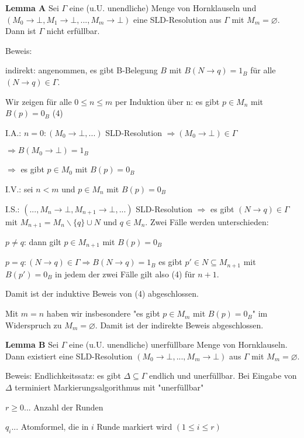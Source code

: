 \documentclass[a4paper]{article}
\renewcommand{\note}[2]{\begin{noteBox} \textbf{#1} #2 \end{noteBox}}
\begin{document}
\begin{multicols}{3}
  \note{Lemma A}{Sei $\Gamma$ eine (u.U. unendliche) Menge von Hornklauseln und $(M_0\rightarrow\bot, M_1\rightarrow\bot,... , M_m\rightarrow\bot)$ eine SLD-Resolution aus $\Gamma$ mit $M_m=\varnothing$. Dann ist $\Gamma$ nicht erfüllbar.}

  Beweis:
  \begin{itemize*}
    \item indirekt: angenommen, es gibt B-Belegung $B$ mit $B(N\rightarrow q) = 1_B$ für alle $(N\rightarrow q)\in\Gamma$.
    \item Wir zeigen für alle $0\leq n\leq m$ per Induktion über n: es gibt $p\in M_n$ mit $B(p) = 0_B$ (4)
    \item I.A.: $n=0:(M_0 \rightarrow\bot,...)$ SLD-Resolution $\Rightarrow(M_0\rightarrow\bot)\in\Gamma$
    \begin{itemize*}
      \item $\Rightarrow B(M_0\rightarrow\bot) = 1_B$
      \item $\Rightarrow$ es gibt $p\in M_0$ mit $B(p) = 0_B$
    \end{itemize*}
    \item I.V.: sei $n<m$ und $p\in M_n$ mit $B(p) = 0_B$
    \item I.S.: $(... ,M_n\rightarrow\bot,M_{n+ 1}\rightarrow\bot,...)$ SLD-Resolution $\Rightarrow$ es gibt $(N\rightarrow q)\in\Gamma$ mit $M_{n+1} =M_n\backslash\{q\}\cup N$ und $q\in M_n$. Zwei Fälle werden unterschieden:
    \begin{enumerate*}
      \item $p\not=q$: dann gilt $p\in M_{n+1}$ mit $B(p) = 0_B$
      \item $p=q:(N\rightarrow q)\in\Gamma\Rightarrow B(N\rightarrow q) = 1_B$ es gibt $p'\in N\subseteq M_{n+1}$ mit $B(p')=0_B$
      in jedem der zwei Fälle gilt also (4) für $n+1$.
    \end{enumerate*}
    \item Damit ist der induktive Beweis von (4) abgeschlossen.
    \item Mit $m=n$ haben wir insbesondere "es gibt $p\in M_m$ mit $B(p) = 0_B$" im Widerspruch zu $M_m=\varnothing$. Damit ist der indirekte Beweis abgeschlossen.
  \end{itemize*}

  \note{Lemma B}{Sei $\Gamma$ eine (u.U. unendliche) unerfüllbare Menge von Hornklauseln. Dann existiert eine SLD-Resolution $(M_0\rightarrow\bot,...,M_m\rightarrow\bot)$ aus $\Gamma$ mit $M_m=\varnothing$.}

  Beweis: Endlichkeitssatz: es gibt $\Delta\subseteq\Gamma$ endlich und unerfüllbar. Bei Eingabe von$\Delta$ terminiert Markierungsalgorithmus mit "unerfüllbar"
  \begin{itemize*}
    \item $r\geq 0...$ Anzahl der Runden
    \item $q_i...$ Atomformel, die in $i$ Runde markiert wird $(1\leq i\leq r)$
  \end{itemize*}


\end{multicols}
\end{document}
